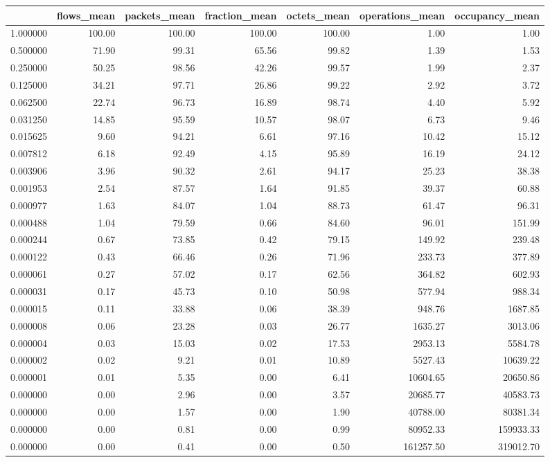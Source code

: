 \begin{tabular}{lrrrrrr}
\toprule
 & flows_mean & packets_mean & fraction_mean & octets_mean & operations_mean & occupancy_mean \\
\midrule
1.000000 & 100.00 & 100.00 & 100.00 & 100.00 & 1.00 & 1.00 \\
0.500000 & 71.90 & 99.31 & 65.56 & 99.82 & 1.39 & 1.53 \\
0.250000 & 50.25 & 98.56 & 42.26 & 99.57 & 1.99 & 2.37 \\
0.125000 & 34.21 & 97.71 & 26.86 & 99.22 & 2.92 & 3.72 \\
0.062500 & 22.74 & 96.73 & 16.89 & 98.74 & 4.40 & 5.92 \\
0.031250 & 14.85 & 95.59 & 10.57 & 98.07 & 6.73 & 9.46 \\
0.015625 & 9.60 & 94.21 & 6.61 & 97.16 & 10.42 & 15.12 \\
0.007812 & 6.18 & 92.49 & 4.15 & 95.89 & 16.19 & 24.12 \\
0.003906 & 3.96 & 90.32 & 2.61 & 94.17 & 25.23 & 38.38 \\
0.001953 & 2.54 & 87.57 & 1.64 & 91.85 & 39.37 & 60.88 \\
0.000977 & 1.63 & 84.07 & 1.04 & 88.73 & 61.47 & 96.31 \\
0.000488 & 1.04 & 79.59 & 0.66 & 84.60 & 96.01 & 151.99 \\
0.000244 & 0.67 & 73.85 & 0.42 & 79.15 & 149.92 & 239.48 \\
0.000122 & 0.43 & 66.46 & 0.26 & 71.96 & 233.73 & 377.89 \\
0.000061 & 0.27 & 57.02 & 0.17 & 62.56 & 364.82 & 602.93 \\
0.000031 & 0.17 & 45.73 & 0.10 & 50.98 & 577.94 & 988.34 \\
0.000015 & 0.11 & 33.88 & 0.06 & 38.39 & 948.76 & 1687.85 \\
0.000008 & 0.06 & 23.28 & 0.03 & 26.77 & 1635.27 & 3013.06 \\
0.000004 & 0.03 & 15.03 & 0.02 & 17.53 & 2953.13 & 5584.78 \\
0.000002 & 0.02 & 9.21 & 0.01 & 10.89 & 5527.43 & 10639.22 \\
0.000001 & 0.01 & 5.35 & 0.00 & 6.41 & 10604.65 & 20650.86 \\
0.000000 & 0.00 & 2.96 & 0.00 & 3.57 & 20685.77 & 40583.73 \\
0.000000 & 0.00 & 1.57 & 0.00 & 1.90 & 40788.00 & 80381.34 \\
0.000000 & 0.00 & 0.81 & 0.00 & 0.99 & 80952.33 & 159933.33 \\
0.000000 & 0.00 & 0.41 & 0.00 & 0.50 & 161257.50 & 319012.70 \\
\bottomrule
\end{tabular}
